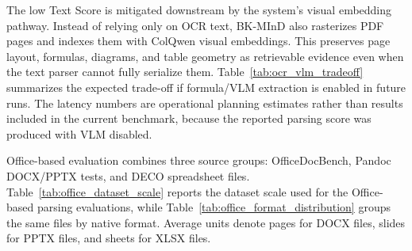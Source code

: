 The low Text Score is mitigated downstream by the system's visual embedding pathway. Instead of relying only on OCR text, BK-MInD also rasterizes PDF pages and indexes them with ColQwen visual embeddings. This preserves page layout, formulas, diagrams, and table geometry as retrievable evidence even when the text parser cannot fully serialize them. Table~\ref{tab:ocr_vlm_tradeoff} summarizes the expected trade-off if formula/VLM extraction is enabled in future runs. The latency numbers are operational planning estimates rather than results included in the current benchmark, because the reported parsing score was produced with VLM disabled.

\begin{table}[H]
    \centering
    \caption{OCR-Only vs. VLM/Formula-Enriched Parsing Trade-off}
    \label{tab:ocr_vlm_tradeoff}
\end{table}

Office-based evaluation combines three source groups: OfficeDocBench, Pandoc DOCX/PPTX tests, and DECO spreadsheet files. Table~\ref{tab:office_dataset_scale} reports the dataset scale used for the Office-based parsing evaluations, while Table~\ref{tab:office_format_distribution} groups the same files by native format. Average units denote pages for DOCX files, slides for PPTX files, and sheets for XLSX files.

